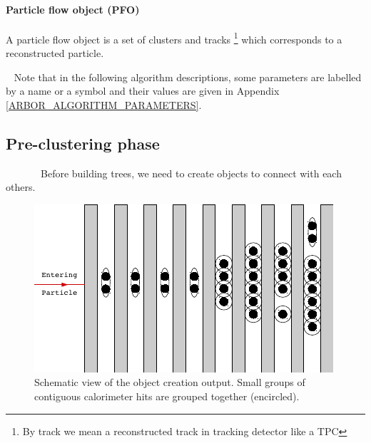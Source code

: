 \documentclass[cits]{JINST}
\begin{document}
\paragraph*{Particle flow object (PFO)} A particle flow object is a set of clusters and tracks \footnote{By track we mean a reconstructed track in tracking detector like a TPC} which corresponds to a reconstructed particle.

~\newline 
Note that in the following algorithm descriptions, some parameters are labelled by a name or a symbol and their values are given in Appendix \ref{ARBOR_ALGORITHM_PARAMETERS}.

\subsection{Pre-clustering phase} 

~~~~~~~Before building trees, we need to create objects to connect with each others.

\begin{figure}
  \vspace{-20pt}
  \begin{center}
    \includegraphics[width=\linewidth]{ObjectCreationAfter.pdf}
  \end{center}
  \vspace{-10pt}
  \caption{\label{ARBOR_OBJECT_CREATION} Schematic view of the object creation output. Small groups of contiguous calorimeter hits are grouped together (encircled).}
  \vspace{-20pt}
\end{figure}
\end{document}
